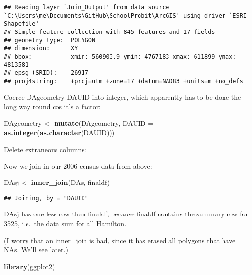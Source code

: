 \documentclass[]{article}
\newenvironment{Shaded}{\begin{snugshade}}{\end{snugshade}}
\newcommand{\DataTypeTok}[1]{\textcolor[rgb]{0.13,0.29,0.53}{#1}}
\newcommand{\KeywordTok}[1]{\textcolor[rgb]{0.13,0.29,0.53}{\textbf{#1}}}
\newcommand{\NormalTok}[1]{#1}
\newcommand{\OperatorTok}[1]{\textcolor[rgb]{0.81,0.36,0.00}{\textbf{#1}}}
\newcommand{\StringTok}[1]{\textcolor[rgb]{0.31,0.60,0.02}{#1}}
\begin{document}
\begin{verbatim}
## Reading layer `Join_Output' from data source `C:\Users\me\Documents\GitHub\SchoolProbit\ArcGIS' using driver `ESRI Shapefile'
## Simple feature collection with 845 features and 17 fields
## geometry type:  POLYGON
## dimension:      XY
## bbox:           xmin: 560903.9 ymin: 4767183 xmax: 611899 ymax: 4813581
## epsg (SRID):    26917
## proj4string:    +proj=utm +zone=17 +datum=NAD83 +units=m +no_defs
\end{verbatim}

Coerce DAgeometry DAUID into integer, which apparently has to be done
the long way round cos it's a factor:

\begin{Shaded}
\begin{Highlighting}[]
\NormalTok{DAgeometry <-}\StringTok{ }\KeywordTok{mutate}\NormalTok{(DAgeometry, }\DataTypeTok{DAUID =} \KeywordTok{as.integer}\NormalTok{(}\KeywordTok{as.character}\NormalTok{(DAUID)))}
\end{Highlighting}
\end{Shaded}

Delete extraneous columns:

\begin{Shaded}
\end{Shaded}

Now we join in our 2006 census data from above:

\begin{Shaded}
\begin{Highlighting}[]
\NormalTok{DAsj <-}\StringTok{ }\KeywordTok{inner_join}\NormalTok{(DAs, finaldf)}
\end{Highlighting}
\end{Shaded}

\begin{verbatim}
## Joining, by = "DAUID"
\end{verbatim}

DAsj has one less row than finaldf, because finaldf contains the summary
row for 3525, i.e.~the data sum for all Hamilton.

(I worry that an inner\_join is bad, since it has erased all polygons
that have NAs. We'll see later.)

\begin{Shaded}
\begin{Highlighting}[]
\KeywordTok{library}\NormalTok{(ggplot2)}
\end{Highlighting}
\end{Shaded}
\end{document}
